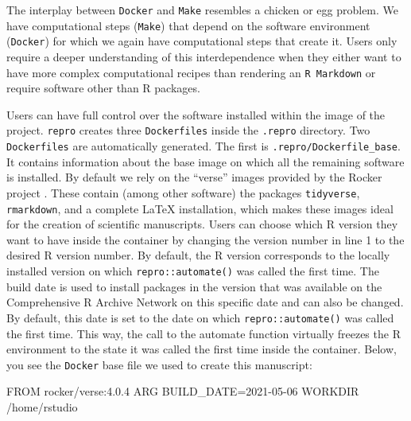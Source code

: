\documentclass[psych,tutorial,accept,moreauthors,pdftex]{Definitions/mdpi}
\newenvironment{Shaded}{\begin{snugshade}}{\end{snugshade}}
\newcommand{\ExtensionTok}[1]{#1}
\newcommand{\NormalTok}[1]{#1}
\begin{document}
\begin{paracol}{2}
The interplay between \texttt{Docker} and \texttt{Make} resembles a
chicken or egg problem. We have computational steps (\texttt{Make}) that
depend on the software environment (\texttt{Docker}) for which we again
have computational steps that create it. Users only require a deeper
understanding of this interdependence when they either want to have more
complex computational recipes than rendering an \texttt{R\ Markdown} or
require software other than R packages.

Users can have full control over the software installed within the image
of the project. \texttt{repro} creates three \texttt{Dockerfiles} inside
the \texttt{.repro} directory. Two \texttt{Dockerfiles} are
automatically generated. The first is \texttt{.repro/Dockerfile\_base}.
It contains information about the base image on which all the remaining
software is installed. By default we rely on the ``verse'' images
provided by the Rocker project
\citep{boettigerIntroductionRockerDocker2017}. These contain (among
other software) the packages \texttt{tidyverse}, \texttt{rmarkdown}, and
a complete LaTeX installation, which makes these images ideal for the
creation of scientific manuscripts. Users can choose which R version
they want to have inside the container by changing the version number in
line 1 to the desired R version number. By default, the R version
corresponds to the locally installed version on which
\texttt{repro::automate()} was called the first time. The build date is
used to install packages in the version that was available on the
Comprehensive R Archive Network on this specific date and can also be
changed. By default, this date is set to the date on which
\texttt{repro::automate()} was called the first time. This way, the call
to the automate function virtually freezes the R environment to the
state it was called the first time inside the container. Below, you see
the \texttt{Docker} base file we used to create this manuscript:

\begin{adjustwidth}{0.5cm}{0cm} 
\begin{Shaded}
\begin{Highlighting}[]
\ExtensionTok{FROM}\NormalTok{ rocker/verse:4.0.4}
\ExtensionTok{ARG}\NormalTok{ BUILD\_DATE=2021{-}05{-}06}
\ExtensionTok{WORKDIR}\NormalTok{ /home/rstudio}
\end{Highlighting}
\end{Shaded}
\end{adjustwidth}


\end{paracol}
\end{document}
